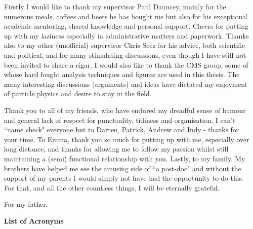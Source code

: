 \begin{acknowledgements}
  Firstly I would like to thank my supervisor Paul Dauncey, mainly for the numerous meals, coffees and beers he has bought me but also for his exceptional academic mentoring, shared knowledge and personal support. Cheers for putting up with my laziness especially in administrative matters and paperwork. Thanks also to my other (unofficial) supervisor Chris Seez for his advice, both scientific and political, and for many stimulating discussions, even though I have still not been invited to share a cigar. I would also like to thank the CMS \Hgg group, some of whose hard fought analysis techniques and figures are used in this thesis. The many interesting discussions (arguments) and ideas have dictated my enjoyment of particle physics and desire to stay in the field.

  Thank you to all of my friends, who have endured my dreadful sense of humour and general lack of respect for punctuality, tidiness and organisation. I can't ``name check" everyone but to Darren, Patrick, Andrew and Indy - thanks for your time. To Emma, thank you so much for putting up with me, especially over long distance, and thanks for allowing me to follow my passion whilst still maintaining a (semi) functional relationship with you. Lastly, to my family. My brothers have helped me see the amusing side of ``a post-doc" and without the support of my parents I would simply not have had the opportunity to do this. For that, and all the other countless things, I will be eternally grateful. 

\end{acknowledgements}



\frontquote%
  {For my father.}%
  {}

\tableofcontents
\listoffigures
\listoftables
\newpage
\thispagestyle{empty}
{}
\vspace*{1.95cm} \hspace*{-0.155cm} %
\textbf{{\huge List of Acronyms}\\}
\vspace*{0.5cm}


